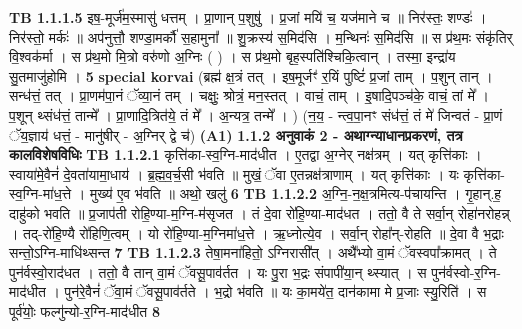 \documentclass[17pt]{extarticle}
\begin{document}
                                \textbf{ TB 1.1.1.5} \newline
                  इष॒-मूर्ज॑म॒स्मासु॑ धत्तम् । प्रा॒णान् प॒शुषु॑ । प्र॒जां मयि॑ च॒ यज॑माने च ॥ निर॑स्तः॒ शण्डः॑ । निर॑स्तो॒ मर्कः॑ ॥ अप॑नुत्तौ॒ शण्डा॒मर्कौ॑ स॒हामुना᳚ ॥ शु॒क्रस्य॑ स॒मिद॑सि । म॒न्थिनः॑ स॒मिद॑सि ॥ स प्र॑थ॒मः संकृ॑तिर् वि॒श्वक॑र्मा । स प्र॑थ॒मो मि॒त्रो वरु॑णो अ॒ग्निः ( ) । स प्र॑थ॒मो बृह॒स्पति॑श्चिकि॒त्वान् । तस्मा॒ इन्द्रा॑य सु॒तमाजु॑होमि । \textbf{ 5} \newline
                  \newline
                                                        \textbf{special korvai} \newline
              (ब्रह्म॑ क्ष॒त्रं तत् । इष॒मूर्जꣳ॑ र॒यिं पुष्टिं॑ प्र॒जां ताम् । प॒शुन् तान् । सन्ध॑त्तं॒ तत् । प्रा॒णम॑पा॒नं ॅव्या॒नं तम् । चक्षुः॒ श्रोत्रं॒ मन॒स्तत् । वाचं॒ ताम् । इ॒षादि॒पञ्च॑के॒ वाचं॒ तां मे᳚ । प॒शून् थ्संध॑त्तं॒ तान्मे᳚ । प्रा॒णादि॒त्रित॑ये॒ तं मे᳚ । अ॒न्यत्र॒ तन्मे᳚ । ) \newline
                                (न॒य॒ - न्त्व॒पा॒नꣳ संध॑त्तं॒ तं मे॑ जिन्वतं - प्रा॒णं ॅय॒ज्ञाय॑ धत्तं॒ - मानु॑षीर् - अ॒ग्निर् द्वे च॑) \textbf{(A1)} \newline \newline
                \textbf{ 1.1.2     अनुवाकं   2 - अथाग्न्याधानप्रकरणं, तत्र कालविशेषविधिः} \newline
                                \textbf{ TB 1.1.2.1} \newline
                  कृत्ति॑का-स्व॒ग्नि-माद॑धीत । ए॒तद्वा अ॒ग्नेर् नक्ष॑त्रम् । यत् कृत्ति॑काः । स्वाया॑मे॒वैनं॑ दे॒वता॑यामा॒धाय॑ । ब्र॒ह्म॒व॒र्च॒सी भ॑वति ॥ मुखं॒ ॅवा ए॒तन्नक्ष॑त्राणाम् । यत् कृत्ति॑काः । यः कृत्ति॑का-स्व॒ग्नि-मा॑ध॒त्ते । मुख्य॑ ए॒व भ॑वति ॥ अथो॒ खलु॑ \textbf{ 6} \newline
                  \newline
                                \textbf{ TB 1.1.2.2} \newline
                  अ॒ग्नि॒-न॒क्ष॒त्रमित्य-प॑चायन्ति । गृ॒हान्.ह॒ दाहु॑को भवति ॥ प्र॒जाप॑ती रोहि॒ण्या-म॒ग्नि-म॑सृजत । तं दे॒वा रो॑हि॒ण्या-माद॑धत । ततो॒ वै ते सर्वा॒न् रोहा॑नरोहन्न् । तद्-रो॑हि॒ण्यै रो॑हिणि॒त्वम् । यो रो॑हि॒ण्या-म॒ग्निमा॑ध॒त्ते । ऋ॒ध्नोत्ये॒व । सर्वा॒न् रोहा᳚न्-रोहति ॥ दे॒वा वै भ॒द्राः सन्तो॒ऽग्नि-माधि॑थ्सन्त \textbf{ 7} \newline
                  \newline
                                \textbf{ TB 1.1.2.3} \newline
                  तेषा॒मना॑हितो॒ ऽग्निरासी᳚त् । अथै᳚भ्यो वा॒मं ॅवस्वपा᳚क्रामत् । ते पुन॑र्वस्वो॒राद॑धत । ततो॒ वै तान् वा॒मं ॅवसू॒पाव॑र्तत । यः पु॒रा भ॒द्रः संपापी॑या॒न् थ्स्यात् । स पुन॑र्वस्वो-र॒ग्नि-माद॑धीत । पुन॑रे॒वैनं॑ ॅवा॒मं ॅवसू॒पाव॑र्तते । भ॒द्रो भ॑वति ॥ यः का॒मये॑त॒ दान॑कामा मे प्र॒जाः स्यु॒रिति॑ । स पूर्व॑योः॒ फल्गु॑न्यो-र॒ग्नि-माद॑धीत \textbf{ 8} \newline
\end{document}
